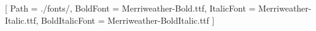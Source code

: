 \usepackage{fontspec}
\usepackage{emoji}
\setmainfont{Merriweather-Regular.ttf}[
    Path = ./fonts/,
    BoldFont = Merriweather-Bold.ttf,
    ItalicFont = Merriweather-Italic.ttf,
    BoldItalicFont = Merriweather-BoldItalic.ttf
]
